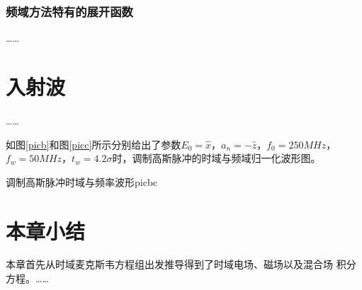 \subsubsection{频域方法特有的展开函数}
……
\section{入射波}
……

如图\ref{picb}和图\ref{picc}所示分别给出了参数$E_0=\hat{x}$，$a_n=-\hat{z}$，$f_0=250MHz$，$f_w=50MHz$，$t_w=4.2\sigma$时，调制高斯脉冲的时域与频域归一化波形图。
\begin{pics}[h]{调制高斯脉冲时域与频率波形}{picbc}
\end{pics}
\section{本章小结}
本章首先从时域麦克斯韦方程组出发推导得到了时域电场、磁场以及混合场
积分方程。……
